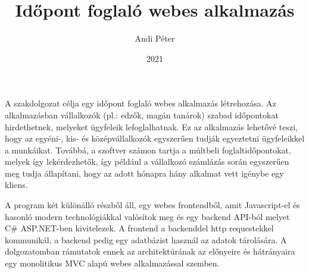 \documentclass[
	nohyp, %
]{elteikthesis}[2021/05/15]
\title{Időpont foglaló webes alkalmazás} %
\date{2021} %
\author{Andi Péter}
\affiliation{adjunktus} %
\begin{document}

\listoftodos[\todolabel]



\maketitle

{}
A szakdolgozat célja egy időpont foglaló webes alkalmazás létrehozása. Az alkalmazásban vállalkozók (pl.: edzők, magán tanárok) szabad időpontokat hirdethetnek, melyeket ügyfeleik lefoglalhatnak. Ez az alkalmazás lehetővé teszi, hogy az egyéni-, kis- és középvállalkozók egyszerűen tudják egyeztetni ügyfeleikkel a munkáikat. Továbbá, a szoftver számon tartja a múltbeli foglaltidőpontokat, melyek így lekérdezhetők, így például a vállalkozó számlázás során egyszerűen meg tudja állapítani, hogy az adott hónapra hány alkalmat vett igénybe egy kliens.

A program két különálló részből áll, egy webes frontendből, amit Javascript-el és hasonló modern technológiákkal valósítok meg és egy backend API-ból melyet C\# ASP.NET-ben kivitelezek. A frontend a backenddel http requestekkel kommunikál, a backend pedig egy adatbázist használ az adatok tárolására. A dolgozatomban rámutatok ennek az architektúrának az előnyeire és hátrányaira egy monolitikus MVC alapú webes alkalmazással szemben.

\pagebreak

\tableofcontents
\cleardoublepage


\cleardoublepage


\cleardoublepage


\cleardoublepage


\cleardoublepage

\appendix

\cleardoublepage

\printbibliography[title=\biblabel]
\cleardoublepage

\listoffigures
\cleardoublepage

\listoftables
\cleardoublepage

\lstlistoflistings
\cleardoublepage

\end{document}
